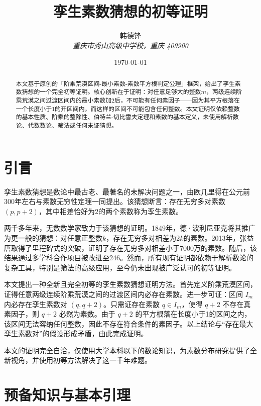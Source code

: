 \documentclass[12pt,a4paper,reqno]{amsart}
\title{孪生素数猜想的初等证明}
\author{韩德锋 \\\textit{重庆市秀山高级中学校，重庆 409900} }
\date{\today}
\theoremstyle{plain}
\theoremstyle{definition}
\theoremstyle{remark}
\begin{document}
	\begin{abstract}
		本文基于原创的「阶乘荒漠区间-最小素数-素数平方根判定公理」框架，给出了孪生素数猜想的一个完全初等证明。核心创新在于证明：对任意足够大的整数$m$，两级连续阶乘荒漠之间过渡区间内的最小素数加2后，不可能有任何素因子——因为其平方根落在一个长度小于1的开区间内，而这样的区间不可能包含任何整数。本文证明仅依赖整数的基本性质、阶乘的整除性、伯特兰-切比雪夫定理和素数的基本定义，未使用解析数论、代数数论、筛法或任何未证猜想。
		
	\end{abstract}
	
	
	\maketitle
	
	\section{引言}
	孪生素数猜想是数论中最古老、最著名的未解决问题之一，由欧几里得在公元前300年左右与素数无穷性定理一同提出。该猜想断言：存在无穷多对素数$(p, p+2)$，其中相差恰好为2的两个素数称为孪生素数。
	
	两千多年来，无数数学家致力于该猜想的证明。1849年，德·波利尼亚克将其推广为更一般的猜想：对任意正整数$k$，存在无穷多对相差为$2k$的素数。2013年，张益唐取得了里程碑式的突破，证明了存在无穷多对相差小于7000万的素数。随后，该结果通过多学科合作项目被改进至246。然而，所有现有证明都依赖于解析数论的复杂工具，特别是筛法的高级应用，至今仍未出现被广泛认可的初等证明。
	
	本文提出一种全新且完全初等的孪生素数猜想证明方法。首先定义阶乘荒漠区间，证得任意两级连续阶乘荒漠之间的过渡区间内必存在素数。进一步可证：区间 $I_m$ 内必存在孪生素数对 $(q,q+2)$。只需证存在素数 $q\in I_m$，使得 $q+2$ 不存在真素因子，则 $q+2$ 必然为素数。由于 $q+2$ 的平方根落在长度小于1的区间之内，该区间无法容纳任何整数，因此不存在符合条件的素因子。以上结论与“存在最大孪生素数对”的假设形成矛盾，由此完成证明。
	
	本文的证明完全自洽，仅使用大学本科以下的数论知识，为素数分布研究提供了全
	新视角，并使用初等方法解决了这一千年难题。
	
	\section{预备知识与基本引理}
	
\end{document}
